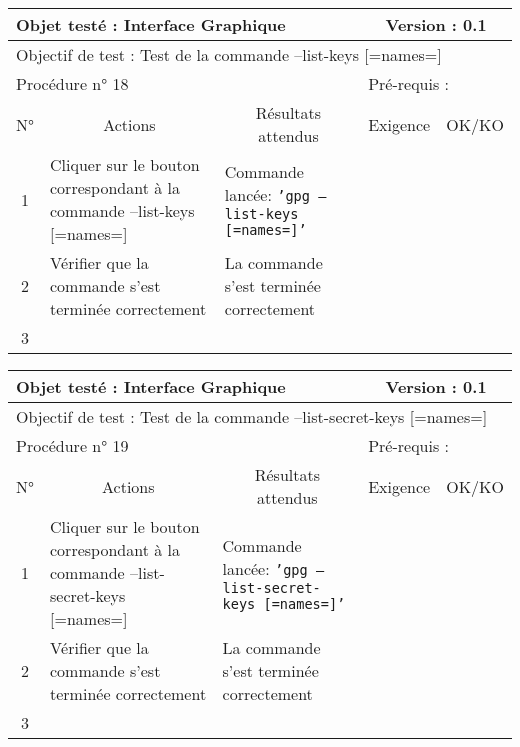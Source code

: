 \documentclass{../res/univ-projet}
\begin{document}
\begin{center}
\begin{tabular}{|c|p{5cm}|p{5cm}|p{1.5cm}|p{1.5cm}|}
\hline
\multicolumn{3}{|l|}{Objet testé : Interface Graphique} & \multicolumn{2}{c|}{Version : 0.1}\\ \hline
\multicolumn{5}{|l|}{Objectif de test : Test de la commande –list-keys [=names=]}\\ \hline
\multicolumn{3}{|l|}{Procédure n° 18} & \multicolumn{2}{p{3cm}|}{Pré-requis : }\\ \hline
\multicolumn{1}{|c|}{N°} & \multicolumn{1}{c|}{Actions} & \multicolumn{1}{c|}{Résultats attendus} & 
\multicolumn{1}{c|}{Exigence} & \multicolumn{1}{c|}{OK/KO}\\ \hline
1 & Cliquer sur le bouton correspondant à la commande –list-keys [=names=] & Commande lancée: \texttt{'gpg –list-keys [=names=]'} &  & \\
2 & Vérifier que la commande s'est terminée correctement & La commande s'est terminée correctement &  & \\
3 &  &  &  & \\ \hline
\end{tabular}
\vskip 2.2cm


\begin{tabular}{|c|p{5cm}|p{5cm}|p{1.5cm}|p{1.5cm}|}
\hline
\multicolumn{3}{|l|}{Objet testé : Interface Graphique} & \multicolumn{2}{c|}{Version : 0.1}\\ \hline
\multicolumn{5}{|l|}{Objectif de test : Test de la commande –list-secret-keys [=names=]}\\ \hline
\multicolumn{3}{|l|}{Procédure n° 19} & \multicolumn{2}{p{3cm}|}{Pré-requis : }\\ \hline
\multicolumn{1}{|c|}{N°} & \multicolumn{1}{c|}{Actions} & \multicolumn{1}{c|}{Résultats attendus} & 
\multicolumn{1}{c|}{Exigence} & \multicolumn{1}{c|}{OK/KO}\\ \hline
1 & Cliquer sur le bouton correspondant à la commande –list-secret-keys [=names=] & Commande lancée: \texttt{'gpg –list-secret-keys [=names=]'} &  & \\
2 & Vérifier que la commande s'est terminée correctement & La commande s'est terminée correctement &  & \\
3 &  &  &  & \\ \hline
\end{tabular}
\vskip 2.2cm



\end{center}
\end{document}
